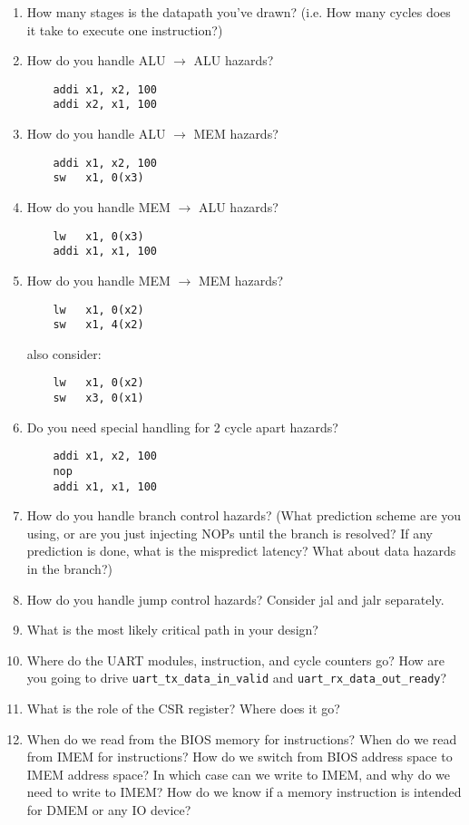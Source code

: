 \begin{enumerate}
\item How many stages is the datapath you've drawn? (i.e. How many cycles does it take to execute one instruction?)
\item How do you handle ALU $\rightarrow$ ALU hazards?
  \begin{verbatim}
    addi x1, x2, 100 
    addi x2, x1, 100
  \end{verbatim}
\item How do you handle ALU $\rightarrow$ MEM hazards?
  \begin{verbatim}
    addi x1, x2, 100
    sw   x1, 0(x3)
    \end{verbatim}
\item How do you handle MEM $\rightarrow$ ALU hazards?
  \begin{verbatim}
    lw   x1, 0(x3)
    addi x1, x1, 100
  \end{verbatim}
\item How do you handle MEM $\rightarrow$ MEM hazards?
  \begin{verbatim}
    lw   x1, 0(x2)
    sw   x1, 4(x2)
  \end{verbatim}
  also consider:
  \begin{verbatim}
    lw   x1, 0(x2)
    sw   x3, 0(x1)
  \end{verbatim}
\item Do you need special handling for 2 cycle apart hazards?
  \begin{verbatim}
    addi x1, x2, 100
    nop
    addi x1, x1, 100
\end{verbatim}
\item How do you handle branch control hazards?
  (What prediction scheme are you using, or are you just injecting NOPs until the branch is resolved?
  If any prediction is done, what is the mispredict latency?
  What about data hazards in the branch?)
\item How do you handle jump control hazards?
  Consider jal and jalr separately.
\item What is the most likely critical path in your design?
\item Where do the UART modules, instruction, and cycle counters go?
  How are you going to drive \verb|uart_tx_data_in_valid| and \verb|uart_rx_data_out_ready|?
\item What is the role of the CSR register? Where does it go?
\item When do we read from the BIOS memory for instructions?
  When do we read from IMEM for instructions?
  How do we switch from BIOS address space to IMEM address space?
  In which case can we write to IMEM, and why do we need to write to IMEM?
  How do we know if a memory instruction is intended for DMEM or any IO device?
\end{enumerate}


\newpage
